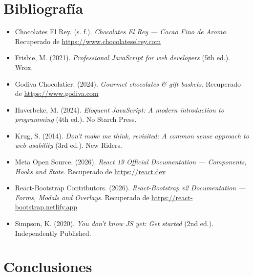 \documentclass[12pt,letterpaper]{article}
\begin{document}
\section{Bibliografía}

\begin{itemize}[leftmargin=1.2cm]
  \item Chocolates El Rey. (s. f.). \textit{Chocolates El Rey — Cacao Fino de Aroma}. Recuperado de \url{https://www.chocolateselrey.com}
  \item Frisbie, M. (2021). \textit{Professional JavaScript for web developers} (5th ed.). Wrox.
  \item Godiva Chocolatier. (2024). \textit{Gourmet chocolates \& gift baskets}. Recuperado de \url{https://www.godiva.com}
  \item Haverbeke, M. (2024). \textit{Eloquent JavaScript: A modern introduction to programming} (4th ed.). No Starch Press.
  \item Krug, S. (2014). \textit{Don't make me think, revisited: A common sense approach to web usability} (3rd ed.). New Riders.
  \item Meta Open Source. (2026). \textit{React 19 Official Documentation — Components, Hooks and State}. Recuperado de \url{https://react.dev}
  \item React-Bootstrap Contributors. (2026). \textit{React-Bootstrap v2 Documentation — Forms, Modals and Overlays}. Recuperado de \url{https://react-bootstrap.netlify.app}
  \item Simpson, K. (2020). \textit{You don't know JS yet: Get started} (2nd ed.). Independently Published.
\end{itemize}

\section{Conclusiones}
\end{document}
